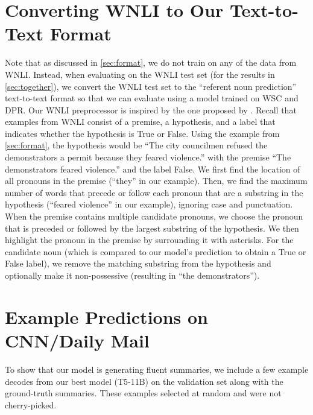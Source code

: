 \documentclass[twoside,11pt]{article}
\begin{document}
\section{Converting WNLI to Our Text-to-Text Format}
\label{sec:wnli_preprocessing}

Note that as discussed in \cref{sec:format}, we do not train on any of the data from WNLI.
Instead, when evaluating on the WNLI test set (for the results in \cref{sec:together}), we convert the WNLI test set to the ``referent noun prediction'' text-to-text format so that we can evaluate using a model trained on WSC and DPR.
Our WNLI preprocessor is inspired by the one proposed by \cite{he2019hybrid}.
Recall that examples from WNLI consist of a premise, a hypothesis, and a label that indicates whether the hypothesis is True or False.
Using the example from \cref{sec:format}, the hypothesis would be ``The city councilmen refused the demonstrators a permit because they
feared violence.'' with the premise ``The demonstrators feared violence.'' and the label False.
We first find the location of all pronouns in the premise (``they'' in our example).
Then, we find the maximum number of words that precede or follow each pronoun that are a substring in the hypothesis (``feared violence'' in our example), ignoring case and punctuation.
When the premise contains multiple candidate pronouns, we choose the pronoun that is preceded or followed by the largest substring of the hypothesis.
We then highlight the pronoun in the premise by surrounding it with asterisks.
For the candidate noun (which is compared to our model's prediction to obtain a True or False label), we remove the matching substring from the hypothesis and optionally make it non-possessive (resulting in ``the demonstrators'').

\section{Example Predictions on CNN/Daily Mail}
\label{sec:cnndm_decodes}

To show that our model is generating fluent summaries, we include a few example decodes from our best model (T5-11B) on the validation set along with the ground-truth summaries.
These examples selected at random and were not cherry-picked.
\end{document}
